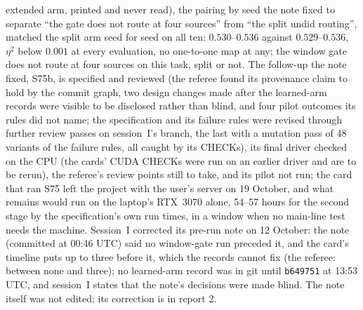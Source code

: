 \documentclass[11pt]{article}
\begin{document}
extended arm, printed and never read), the pairing by seed the note fixed to separate ``the gate does not route at four sources'' from ``the split undid routing'', matched the split arm seed for seed on all ten: $0.530$--$0.536$ against $0.529$--$0.536$, $\eta^2$ below $0.001$ at every evaluation, no one-to-one map at any; the window gate does not route at four sources on this task, split or not. The follow-up the note fixed, S75b, is specified and reviewed (the referee found its provenance claim to hold by the commit graph, two design changes made after the learned-arm records were visible to be disclosed rather than blind, and four pilot outcomes its rules did not name; the specification and its failure rules were revised through further review passes on session~I's branch, the last with a mutation pass of 48 variants of the failure rules, all caught by its CHECKs), its final driver checked on the CPU (the cards' CUDA CHECKs were run on an earlier driver and are to be rerun), the referee's review points still to take, and its pilot not run; the card that ran S75 left the project with the user's server on 19 October, and what remains would run on the laptop's RTX~3070 alone, 54--57 hours for the second stage by the specification's own run times, in a window when no main-line test needs the machine. Session~I corrected its pre-run note on 12 October: the note (committed at 00:46 UTC) said no window-gate run preceded it, and the card's timeline puts up to three before it, which the records cannot fix (the referee: between none and three); no learned-arm record was in git until \texttt{b649751} at 13:53 UTC, and session~I states that the note's decisions were made blind. The note itself was not edited; its correction is in report 2.
\end{document}
